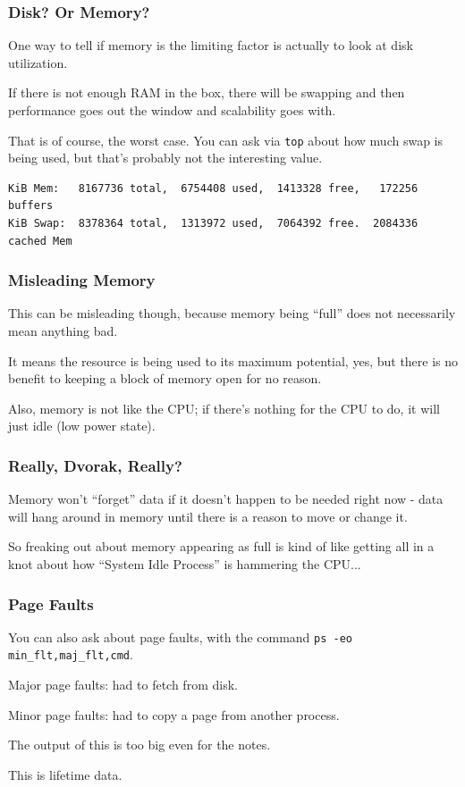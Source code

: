 \begin{frame}[fragile]
\frametitle{Disk? Or Memory?}

One way to tell if memory is the limiting factor is actually to look at disk utilization. 

If there is not enough RAM in the box, there will be swapping and then performance goes out the window and scalability goes with. 

That is of course, the worst case. You can ask via \texttt{top} about how much swap is being used, but that's probably not the interesting value. 

{\scriptsize
\begin{verbatim}
KiB Mem:   8167736 total,  6754408 used,  1413328 free,   172256 buffers
KiB Swap:  8378364 total,  1313972 used,  7064392 free.  2084336 cached Mem
\end{verbatim}
}

\end{frame}



\begin{frame}
\frametitle{Misleading Memory}

This can be misleading though, because memory being ``full'' does not necessarily mean anything bad. 

It means the resource is being used to its maximum potential, yes, but there is no benefit to keeping a block of memory open for no reason.

Also, memory is not like the CPU; if there's nothing for the CPU to do, it will just idle (low power state).

\end{frame}


\begin{frame}
\frametitle{Really, Dvorak, Really?}

Memory won't ``forget'' data if it doesn't happen to be needed right now - data will hang around in memory until there is a reason to move or change it. 

So freaking out about memory appearing as full is kind of like getting all in a knot about how ``System Idle Process'' is hammering the CPU...


\end{frame}




\begin{frame}
\frametitle{Page Faults}

You can also ask about page faults, with the command \texttt{ps -eo min\_flt,maj\_flt,cmd}.

Major page faults: had to fetch from disk. 

Minor page faults: had to copy a page from another process. 

The output of this is too big even for the notes.

This is lifetime data.

\end{frame}



